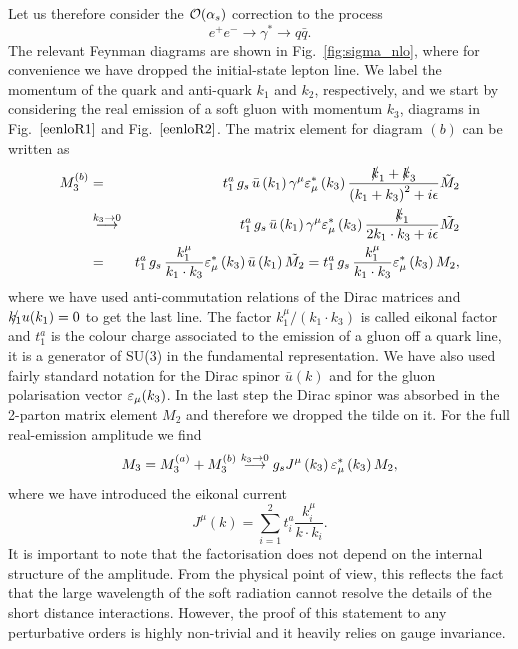 Let us therefore consider the $\mathcal{O}(\alpha_s)$ correction to the process
\begin{equation}
e^+ e^- \to \gamma^* \to  q \bar q.
\end{equation}
The relevant Feynman diagrams are shown in Fig.~\ref{fig:sigma_nlo}, where for convenience we have dropped the initial-state lepton line. 
% 
We label the momentum of the quark and anti-quark $k_1$ and $k_2$,
respectively, and we start by considering the real emission of a soft
gluon with momentum $k_3$, \ie diagrams in Fig.~$\ref{eenloR1}$ and Fig.~$\ref{eenloR2}$.
%
The matrix element for diagram $(b)$ can be written as
\begin{eqnarray}
M_{3}^{(b)}&=&t_{1}^{a}\,\gstrong\, \bar{u}\left(k_1\right)\gamma^{\mu}\e^*_{\mu}\left(k_3\right)\frac{\slashed{k}_1+\slashed{k}_{3}}{\left(k_1+k_3\right)^{2}+i\epsilon}\tilde{M}_{2}\nonumber\\
&\stackrel{k_3\to 0}{\longrightarrow}&t_{1}^{a}\,\gstrong\, \bar{u}\left(k_1\right)\gamma^{\mu}\e^*_{\mu}\left(k_3\right)\frac{\slashed{k}_{1}}{2 k_1 \cdot k_3+i\epsilon}\tilde{M_{2}}\nonumber\\%
&=&t_{1}^{a}\,\gstrong\, \frac{k_1^{\mu}}{k_1\cdot k_3}\e^*_{\mu}\left(k_3\right)  \bar{u}\left(k_1\right) \tilde{M_{2}}
=t_{1}^{a}\,\gstrong\, \frac{k_1^{\mu}}{k_1\cdot k_3}\e^*_{\mu}\left(k_3\right)  {M_{2}},
\end{eqnarray}
where we have used anti-commutation relations of the Dirac matrices and $\slashed{k_1}u(k_1)=0$ to get the last line.
%
The factor $k_1^{\mu}/(k_1\cdot k_3)$ is called eikonal factor and $t_{1}^{a}$ is the colour charge associated to the emission of a gluon off a quark line, \ie it is a generator of SU(3) in the fundamental representation. We have also used fairly standard notation for the Dirac spinor $\bar u(k)$ and for the gluon polarisation vector $\varepsilon_\mu(k_3)$. In the last step the Dirac spinor was absorbed in the 2-parton matrix element $M_2$ and therefore we dropped the tilde on it. For the full real-emission amplitude we find
%
\begin{equation}\label{eq:softfactorisation}
M_{3}=M_{3}^{(a)}+M_{3}^{(b)}\stackrel{k_3\to 0}{\longrightarrow} g_s  J^{\mu}\left(k_3\right)\varepsilon^*_{\mu}\left(k_3\right)M_{2},
\end{equation}
where we have introduced the eikonal current
\begin{equation}\label{eq:eikonalcurrent}
J^{\mu}\left(k\right)=\sum_{i=1}^{2}t_i^{a}\frac{k_i^{\mu}}{k\cdot k_i}.
\end{equation}
It is important to note that the factorisation does not depend on the internal structure of the amplitude. From the physical point of view, this reflects the fact that the large wavelength of the soft radiation cannot resolve the details of the short distance interactions. However, the proof of this statement to any perturbative orders is highly non-trivial and it heavily relies on gauge invariance.


